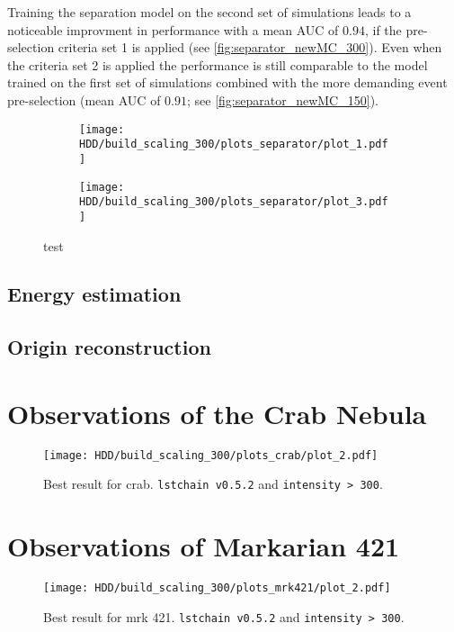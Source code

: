Training the separation model on the second set of simulations leads to a noticeable improvment in performance with a mean AUC of $\num{0.94}$, 
if the pre-selection criteria set 1 is applied (see \autoref{fig:separator_newMC_300}). 
Even when the criteria set 2 is applied the performance is still comparable to the model trained on the first set of simulations combined with the more 
demanding event pre-selection (mean AUC of $\num{0.91}$; see \autoref{fig:separator_newMC_150}).
\begin{figure}
    \centering
    \begin{subfigure}{0.7\textwidth}
        \centering
        \texttt{[image: HDD/build\_scaling\_300/plots\_separator/plot\_1.pdf]}
        \label{fig:separator_newMC_300_1}
    \end{subfigure}
    \hfill
    \begin{subfigure}{0.7\textwidth}
        \centering
        \texttt{[image: HDD/build\_scaling\_300/plots\_separator/plot\_3.pdf]}
        \label{fig:separator_newMC_300_2}
    \end{subfigure}
    \caption{test}
    \label{fig:separator_newMC_300}
\end{figure}


\subsection{Energy estimation}


\subsection{Origin reconstruction}






\section{Observations of the Crab Nebula}

\begin{figure}
    \centering
    \texttt{[image: HDD/build\_scaling\_300/plots\_crab/plot\_2.pdf]}
    \caption{Best result for crab. \texttt{lstchain v0.5.2} and \texttt{intensity > 300}.}
    \label{fig:crab_best}
\end{figure}


\section{Observations of Markarian 421}

\begin{figure}
    \centering
    \texttt{[image: HDD/build\_scaling\_300/plots\_mrk421/plot\_2.pdf]}
    \caption{Best result for mrk 421. \texttt{lstchain v0.5.2} and \texttt{intensity > 300}.}
    \label{fig:mrk_best}
\end{figure}
